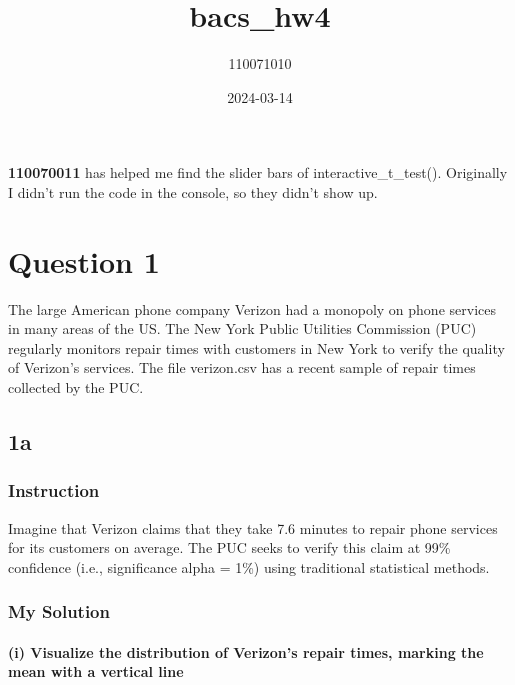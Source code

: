 \documentclass[
]{article}
\title{bacs\_hw4}
\author{110071010}
\date{2024-03-14}
\begin{document}
\maketitle

\textbf{110070011} has helped me find the slider bars of
interactive\_t\_test(). Originally I didn't run the code in the console,
so they didn't show up.

\hypertarget{question-1}{%
\section{Question 1}\label{question-1}}

The large American phone company Verizon had a monopoly on phone
services in many areas of the US. The New York Public Utilities
Commission (PUC) regularly monitors repair times with customers in New
York to verify the quality of Verizon's services. The file verizon.csv
has a recent sample of repair times collected by the PUC.

\hypertarget{a}{%
\subsection{1a}\label{a}}

\hypertarget{instruction}{%
\subsubsection{Instruction}\label{instruction}}

Imagine that Verizon claims that they take 7.6 minutes to repair phone
services for its customers on average. The PUC seeks to verify this
claim at 99\% confidence (i.e., significance alpha = 1\%) using
traditional statistical methods.

\hypertarget{my-solution}{%
\subsubsection{My Solution}\label{my-solution}}

\hypertarget{i-visualize-the-distribution-of-verizons-repair-times-marking-the-mean-with-a-vertical-line}{%
\paragraph{(i) Visualize the distribution of Verizon's repair times,
marking the mean with a vertical
line}\label{i-visualize-the-distribution-of-verizons-repair-times-marking-the-mean-with-a-vertical-line}}
\end{document}
